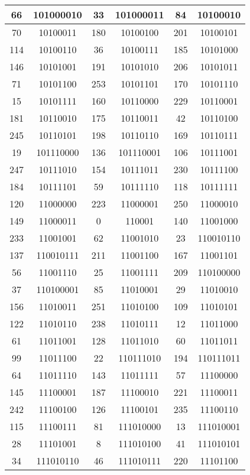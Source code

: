 \documentclass[conference,onecolumn,12pt]{IEEEtran}
\numberwithin{equation}{subsection}
\begin{document}
\begin{table}[h]
\begin{tabular}{cccccc}
66 & 101000010 & 33 & 101000011 & 84 & 10100010 \\ \hline
70 & 10100011 & 180 & 10100100 & 201 & 10100101 \\ \hline
114 & 10100110 & 36 & 10100111 & 185 & 10101000 \\ \hline
146 & 10101001 & 191 & 10101010 & 206 & 10101011 \\ \hline
71 & 10101100 & 253 & 10101101 & 170 & 10101110 \\ \hline
15 & 10101111 & 160 & 10110000 & 229 & 10110001 \\ \hline
181 & 10110010 & 175 & 10110011 & 42 & 10110100 \\ \hline
245 & 10110101 & 198 & 10110110 & 169 & 10110111 \\ \hline
19 & 101110000 & 136 & 101110001 & 106 & 10111001 \\ \hline
247 & 10111010 & 154 & 10111011 & 230 & 10111100 \\ \hline
184 & 10111101 & 59 & 10111110 & 118 & 10111111 \\ \hline
120 & 11000000 & 223 & 11000001 & 250 & 11000010 \\ \hline
149 & 11000011 & 0 & 110001 & 140 & 11001000 \\ \hline
233 & 11001001 & 62 & 11001010 & 23 & 110010110 \\ \hline
137 & 110010111 & 211 & 11001100 & 167 & 11001101 \\ \hline
56 & 11001110 & 25 & 11001111 & 209 & 110100000 \\ \hline
37 & 110100001 & 85 & 11010001 & 29 & 11010010 \\ \hline
156 & 11010011 & 251 & 11010100 & 109 & 11010101 \\ \hline
122 & 11010110 & 238 & 11010111 & 12 & 11011000 \\ \hline
61 & 11011001 & 128 & 11011010 & 60 & 11011011 \\ \hline
99 & 11011100 & 22 & 110111010 & 194 & 110111011 \\ \hline
64 & 11011110 & 143 & 11011111 & 57 & 11100000 \\ \hline
145 & 11100001 & 187 & 11100010 & 221 & 11100011 \\ \hline
242 & 11100100 & 126 & 11100101 & 235 & 11100110 \\ \hline
115 & 11100111 & 81 & 111010000 & 13 & 111010001 \\ \hline
28 & 11101001 & 8 & 111010100 & 41 & 111010101 \\ \hline
34 & 111010110 & 46 & 111010111 & 220 & 11101100 \\ \hline

\end{tabular}
\end{table}
\end{document}
